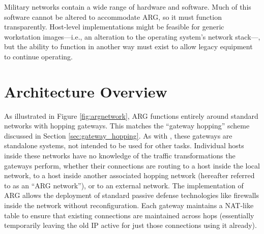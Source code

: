 \par Military networks contain a wide range of hardware and software. Much of this software cannot be altered to accommodate ARG, so it must function transparently. Host-level implementations might be feasible for generic workstation images---i.e., an alteration to the operating system's network stack---, but the ability to function in another way must exist to allow legacy equipment to continue operating.


\section{Architecture Overview}
\label{sec:arg_impl_overview}

\par As illustrated in Figure \ref{fig:argnetwork}, \ac{ARG} functions entirely around standard networks with hopping gateways. This matches the ``gateway hopping'' scheme discussed in Section \ref{sec:gateway_hopping}. As with \cite{TAO}, these gateways are standalone systems, not intended to be used for other tasks. Individual hosts inside these networks have no knowledge of the traffic transformations the gateways perform, whether their connections are routing to a host inside the local network, to a host inside another associated hopping network (hereafter referred to as an ``ARG network''), or to an external network. The implementation of ARG allows the deployment of standard passive defense technologies like firewalls inside the network without reconfiguration. Each gateway maintains a \ac{NAT}-like table to ensure that existing connections are maintained across hops (essentially temporarily leaving the old IP active for just those connections using it already).

